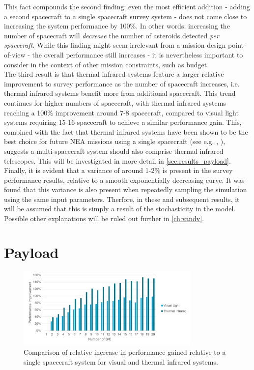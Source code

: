 This fact compounds the second finding: even the most efficient addition - adding a second spacecraft to a single spacecraft survey system - does not come close to increasing the system performance by 100\%. In other words: increasing the number of spacecraft will \textit{decrease} the number of asteroids detected \textit{per spacecraft}. While this finding might seem irrelevant from a mission design point-of-view - the overall performance still increases - it is nevertheless important to consider in the context of other mission constraints, such as budget. \\

The third result is that thermal infrared systems feature a larger relative improvement to survey performance as the number of spacecraft increases, i.e. thermal infrared systems benefit more from additional spacecraft. This trend continues for higher numbers of spacecraft, with thermal infrared systems reaching a 100\% improvement around 7-8 spacecraft, compared to visual light systems requiring 15-16 spacecraft to achieve a similar performance gain. This, combined with the fact that thermal infrared systems have been shown to be the best choice for future NEA missions using a single spacecraft (see e.g. \cite{2017NEOSDT}, \cite{ThesisOlga}), suggests a multi-spacecraft system should also comprise thermal infrared telescopes. This will be investigated in more detail in \autoref{sec:results_payload}.\\

Finally, it is evident that a variance of around 1-2\% is present in the survey performance results, relative to a smooth exponentially decreasing curve. It was found that this variance is also present when repeatedly sampling the simulation using the same input parameters. Therfore, in these and subsequent results, it will be assumed that this is simply a result of the stochasticity in the model. Possible other explanations will be ruled out further in \autoref{ch:vandv}.

\section{Payload}
\label{sec:results_payload}
\begin{figure}[htbp]
 \centering
 \includegraphics[width=0.8\textwidth]{img/tir_vs_vis_many.pdf}
 \caption{Comparison of relative increase in performance gained relative to a single spacecraft system for visual and thermal infrared systems.}
 \label{fig:tir_vs_vis_many}
\end{figure}

